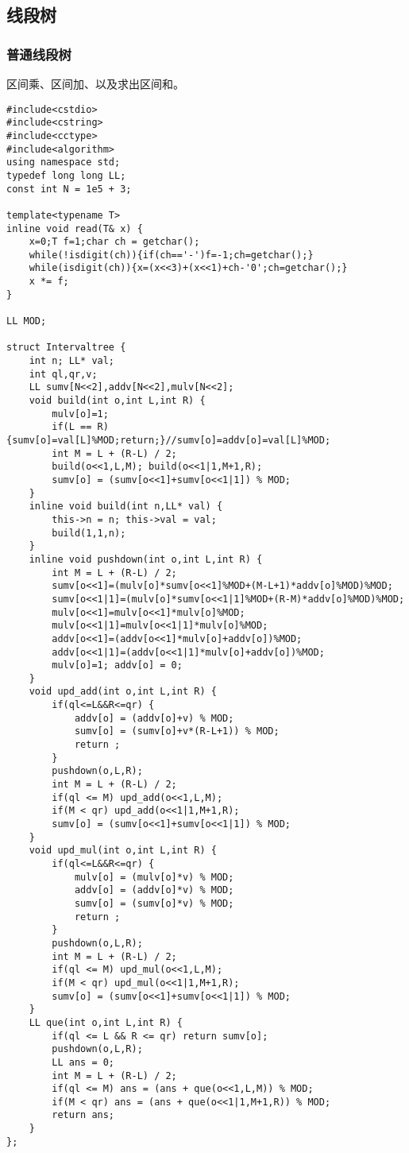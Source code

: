 \documentclass[UTF8]{ctexart}
\begin{document}
\subsection{线段树}
\subsubsection{普通线段树}

区间乘、区间加、以及求出区间和。
\begin{framed}
\begin{lstlisting}
#include<cstdio>
#include<cstring>
#include<cctype>
#include<algorithm>
using namespace std;
typedef long long LL;
const int N = 1e5 + 3;

template<typename T>
inline void read(T& x) {
    x=0;T f=1;char ch = getchar();
    while(!isdigit(ch)){if(ch=='-')f=-1;ch=getchar();}
    while(isdigit(ch)){x=(x<<3)+(x<<1)+ch-'0';ch=getchar();}
    x *= f;
}

LL MOD;

struct Intervaltree {
    int n; LL* val;
    int ql,qr,v;
    LL sumv[N<<2],addv[N<<2],mulv[N<<2];
    void build(int o,int L,int R) {
        mulv[o]=1;
        if(L == R) {sumv[o]=val[L]%MOD;return;}//sumv[o]=addv[o]=val[L]%MOD;
        int M = L + (R-L) / 2;
        build(o<<1,L,M); build(o<<1|1,M+1,R);
        sumv[o] = (sumv[o<<1]+sumv[o<<1|1]) % MOD;
    }
    inline void build(int n,LL* val) {
        this->n = n; this->val = val;
        build(1,1,n);
    }
    inline void pushdown(int o,int L,int R) {
        int M = L + (R-L) / 2;
        sumv[o<<1]=(mulv[o]*sumv[o<<1]%MOD+(M-L+1)*addv[o]%MOD)%MOD;
        sumv[o<<1|1]=(mulv[o]*sumv[o<<1|1]%MOD+(R-M)*addv[o]%MOD)%MOD;
        mulv[o<<1]=mulv[o<<1]*mulv[o]%MOD;
        mulv[o<<1|1]=mulv[o<<1|1]*mulv[o]%MOD;
        addv[o<<1]=(addv[o<<1]*mulv[o]+addv[o])%MOD;
        addv[o<<1|1]=(addv[o<<1|1]*mulv[o]+addv[o])%MOD;
        mulv[o]=1; addv[o] = 0;
    }
    void upd_add(int o,int L,int R) {
        if(ql<=L&&R<=qr) {
            addv[o] = (addv[o]+v) % MOD;
            sumv[o] = (sumv[o]+v*(R-L+1)) % MOD;
            return ;
        }
        pushdown(o,L,R);
        int M = L + (R-L) / 2;
        if(ql <= M) upd_add(o<<1,L,M);
        if(M < qr) upd_add(o<<1|1,M+1,R);
        sumv[o] = (sumv[o<<1]+sumv[o<<1|1]) % MOD;
    }
    void upd_mul(int o,int L,int R) {
        if(ql<=L&&R<=qr) {
            mulv[o] = (mulv[o]*v) % MOD;
            addv[o] = (addv[o]*v) % MOD;
            sumv[o] = (sumv[o]*v) % MOD;
            return ;
        }
        pushdown(o,L,R);
        int M = L + (R-L) / 2;
        if(ql <= M) upd_mul(o<<1,L,M);
        if(M < qr) upd_mul(o<<1|1,M+1,R);
        sumv[o] = (sumv[o<<1]+sumv[o<<1|1]) % MOD;
    }
    LL que(int o,int L,int R) {
        if(ql <= L && R <= qr) return sumv[o];
        pushdown(o,L,R);
        LL ans = 0;
        int M = L + (R-L) / 2;
        if(ql <= M) ans = (ans + que(o<<1,L,M)) % MOD;
        if(M < qr) ans = (ans + que(o<<1|1,M+1,R)) % MOD;
        return ans;
    }
};


\end{lstlisting}
\end{framed}
\end{document}
